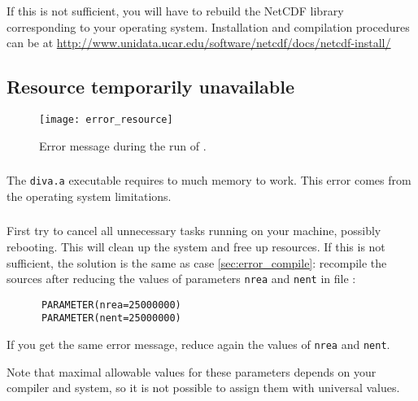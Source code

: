 If this is not sufficient, you will have to rebuild the NetCDF library corresponding to your operating system. Installation and compilation procedures can be at \url{http://www.unidata.ucar.edu/software/netcdf/docs/netcdf-install/}



\subsection[Resource temporarily unavailable]{Resource temporarily unavailable\label{sec:error_resource}}


\begin{figure}[htpb]
\centering
\texttt{[image: error\_resource]}
\caption{Error message during the run of \label{fig:error_resource}.}
\end{figure}

\subsubsection{\question}

The \texttt{diva.a} executable requires to much memory to work. This error comes from the operating system limitations.

\subsubsection{\answer}
First try to cancel all unnecessary tasks running on your machine, possibly rebooting. This will clean up the system and free up resources. If this is not sufficient, the solution is the same as case \ref{sec:error_compile}: recompile the sources after reducing the values of parameters \texttt{nrea} and \texttt{nent} in file :
\begin{verbatim}
      PARAMETER(nrea=25000000)
      PARAMETER(nent=25000000)
\end{verbatim}
If you get the same error message, reduce again the values of \texttt{nrea} and \texttt{nent}.

Note that maximal allowable values for these parameters depends on your compiler and system, so it is not possible to assign them with universal values.

